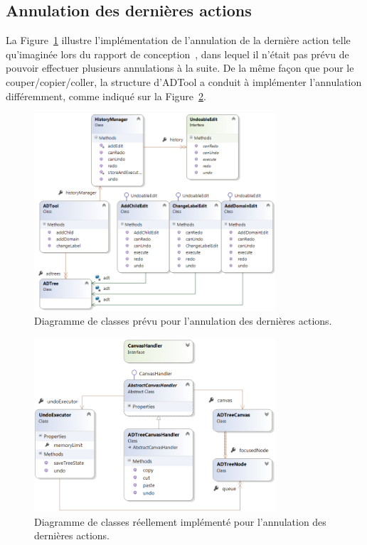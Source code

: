 	\subsection{Annulation des dernières actions}

		 La {\sc Figure}~\ref{fig:ctrlzPrevu} illustre l'implémentation de l'annulation de la dernière action telle qu'imaginée lors du rapport de conception~\cite{conception}, dans lequel il n'était pas prévu de pouvoir effectuer plusieurs annulations à la suite. De la même façon que pour le couper/copier/coller, la structure d'ADTool a conduit à implémenter l'annulation différemment, comme indiqué sur la {\sc Figure}~\ref{fig:ctrlzReel}. 
		 
        \begin{figure}[H]
            \centering
                \includegraphics[width=0.8\textwidth]{figure/ctrlz.png}
            \caption{Diagramme de classes prévu pour l'annulation des dernières actions.}
            \label{fig:ctrlzPrevu}
        \end{figure}
        
        \begin{figure}[H]
            \centering
                \includegraphics[width=0.8\textwidth]{figure/ctrlzReel.png}
            \caption{Diagramme de classes réellement implémenté pour l'annulation des dernières actions.}
            \label{fig:ctrlzReel}
        \end{figure}

